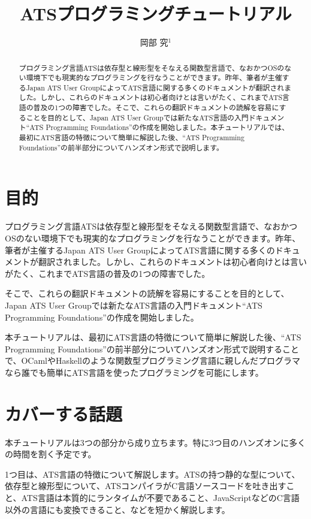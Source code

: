 \documentclass[japanese]{jssst_ppl} %
\title{ATSプログラミングチュートリアル}
\author{岡部 究$^1$}
\begin{document}
\maketitle
\begin{abstract}
プログラミング言語ATSは依存型と線形型をそなえる関数型言語で、なおかつOSのない環境下でも現実的なプログラミングを行なうことができます。昨年、筆者が主催するJapan ATS User GroupによってATS言語に関する多くのドキュメントが翻訳されました。しかし、これらのドキュメントは初心者向けとは言いがたく、これまでATS言語の普及の1つの障害でした。そこで、これらの翻訳ドキュメントの読解を容易にすることを目的として、Japan ATS User Groupでは新たなATS言語の入門ドキュメント``ATS Programming Foundations''の作成を開始しました。本チュートリアルでは、最初にATS言語の特徴について簡単に解説した後、``ATS Programming Foundations''の前半部分についてハンズオン形式で説明します。
\end{abstract}

\section{目的}

プログラミング言語ATS\cite{ats}は依存型と線形型をそなえる関数型言語で、なおかつOSのない環境下でも現実的なプログラミング\cite{fpiot}を行なうことができます。昨年、筆者が主催するJapan ATS User Group\cite{jats-ug}によってATS言語に関する多くのドキュメントが翻訳\cite{INT2PROGINATS-J}\cite{ATS2TUTORIAL-J}\cite{EFFECTIVATS-J}されました。しかし、これらのドキュメントは初心者向けとは言いがたく、これまでATS言語の普及の1つの障害でした。

そこで、これらの翻訳ドキュメントの読解を容易にすることを目的として、Japan ATS User Groupでは新たなATS言語の入門ドキュメント``ATS Programming Foundations''\cite{ats-foundations}の作成を開始しました。

本チュートリアルは、最初にATS言語の特徴について簡単に解説した後、``ATS Programming Foundations''の前半部分についてハンズオン形式で説明することで、OCamlやHaskellのような関数型プログラミング言語に親しんだプログラマなら誰でも簡単にATS言語を使ったプログラミングを可能にします。

\section{カバーする話題}

本チュートリアルは3つの部分から成り立ちます。特に3つ目のハンズオンに多くの時間を割く予定です。

1つ目は、ATS言語の特徴について解説します。ATSの持つ静的な型について、依存型と線形型について、ATSコンパイラがC言語ソースコードを吐き出すこと、ATS言語は本質的にランタイムが不要であること、JavaScriptなどのC言語以外の言語にも変換できること、などを短かく解説します。
\end{document}
